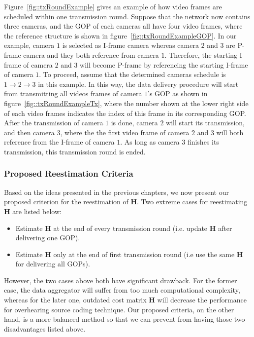{Figure~\ref{fig::txRoundExample} gives an example of how video frames are scheduled within one transmission round.
Suppose that the network now contains three cameras, and the GOP of each cameras all have four video frames, where the reference structure is shown in figure~\ref{fig::txRoundExampleGOP}.
In our example, camera $1$ is selected as I-frame camera whereas camera $2$ and $3$ are P-frame camera and they both reference from camera $1$.
Therefore, the starting I-frame of camera $2$ and $3$ will become P-frame by referencing the starting I-frame of camera $1$.
To proceed, assume that the determined cameras schedule is $1 \rightarrow 2 \rightarrow 3$ in this example.
In this way, the data delivery procedure will start from transmitting all videos frames of camera $1$'s GOP as shown in figure~\ref{fig::txRoundExampleTx}, where the number shown at the lower right side of each video frames indicates the index of this frame in its corresponding GOP.
After the transmission of camera $1$ is done, camera $2$ will start its transmission, and then camera $3$, where the the first video frame of camera $2$ and $3$ will both reference from the I-frame of camera $1$.
As long as camera $3$ finishes its transmission, this transmission round is ended.
%
\subsubsection{Proposed Reestimation Criteria}
\label{sec::reestimationCriteria}
Based on the ideas presented in the previous chapters, we now present our proposed criterion for the reestimation of $\mathbf{H}$.
Two extreme cases for reestimating $\mathbf{H}$ are listed below:
\begin{itemize}
\item Estimate $\mathbf{H}$ at the end of every transmission round (i.e. update $\mathbf{H}$ after delivering one GOP).
\item Estimate $\mathbf{H}$ only at the end of first transmission round (i.e use the same $\mathbf{H}$ for delivering all GOPs).
\end{itemize}
However, the two cases above both have significant drawback.
For the former case, the data aggregator will suffer from too much computational complexity, whereas for the later one, outdated cost matrix $\mathbf{H}$ will decrease the performance for overhearing source coding technique.
Our proposed criteria, on the other hand, is a more balanced method so that we can prevent from having those two disadvantages listed above.

}
